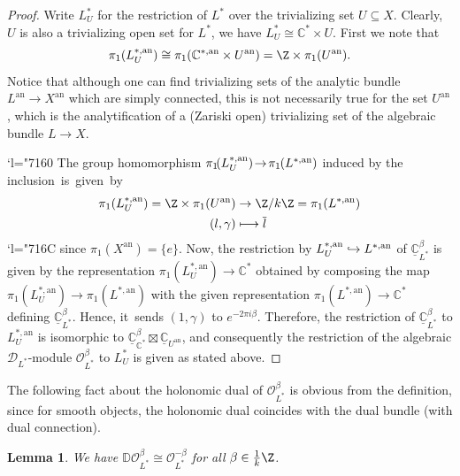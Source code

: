 \documentclass[JEP,XML,SOM,Unicode,published]{cedram}
\let\mathds\mathbb
\newcommand{\Changel}{\mathcode`l="7160}
\newcommand{\Changelback}{\mathcode`l="716C}
\newcommand\mto{\mathchoice{\longmapsto}{\mapsto}{\mapsto}{\mapsto}}
\newcommand\hto{\mathrel{\lhook\joinrel\to}}
\newtheorem{lem}[thm]{Lemma}
\newcommand{\dC}{{\mathds C}}\let\C\dC
\newcommand{\bD}{{\mathbb D}}\let\mbd\bD
\newcommand{\cD}{\mathscr{D}}
\newcommand{\cO}{\mathcal{O}}\let\O\cO
\begin{document}
\begin{proof}
Write $L_U^*$ for the restriction of $L^*$ over the trivializing set $U\subseteq X$. Clearly, $U$ is also a trivializing open set for $L^*$, \ie we have $L^*_{U}\cong \dC^*\times U$. First we note that
\[
\pi_1(L_U^{*,\mathrm{an}})\cong \pi_1(\dC^{*,\mathrm{an}}\times U^{\mathrm{an}})=\Z\times \pi_1(U^\mathrm{an}).
\]
Notice that although one can find trivializing sets of the analytic bundle $L^\mathrm{an}\to X^\mathrm{an}$ which are simply connected, this is not necessarily true for the set $U^\mathrm{an}$, which is the analytification of a (Zariski open) trivializing set of the algebraic bundle $L\to X$.

\Changel%
The group homomorphism $\pi_1\mkern-3mu(L_U^{*,\mathrm{an}}) \mkern-3mu\to\! \pi_1\mkern-1mu(L^{*,\mathrm{an}})$ induced by the inclusion~is~given~by
\begin{align*}
\pi_1(L_U^{*,\mathrm{an}}) = \Z\times \pi_1(U^\mathrm{an}) & \to \Z/k\Z = \pi_1(L^{*,\mathrm{an}}) \\
(l,\gamma) & \mto \overline{l}
\end{align*}\Changelback%
since $\pi_1(X^\mathrm{an})=\{e\}$.
Now, the restriction by $L_U^{*,\mathrm{an}} \hto L^{*,\mathrm{an}}$ of $\underline{\dC}^\beta_{L^*}$ is given by the representation $\pi_1(L_U^{*,\mathrm{an}})\to \dC^*$ obtained by composing the map $\pi_1(L_U^{*,\mathrm{an}}) \to \pi_1(L^{*,\mathrm{an}})$ with the given representation $\pi_1(L^{*,\mathrm{an}})\to \dC^*$ defining $\underline{\dC}^\beta_{L^*}$. Hence, it~sends $(1,\gamma)$ to $e^{-2\pi i \beta}$. Therefore, the restriction of $\underline{\dC}^\beta_{L^*}$ to $L^{*,\mathrm{an}}_U$ is isomorphic to $\underline{\dC}^\beta_{\C^*}\boxtimes \underline{\dC}_{U^\mathrm{an}}$, and consequently the restriction of the algebraic $\cD_{L^*}$\nobreakdash-mod\-ule $\cO_{L^*}^\beta$ to $L_U^*$ is given as stated above.
\end{proof}
The following fact about the holonomic dual of $\cO_{L^*}^\beta$ is obvious from the definition, since for smooth objects, the holonomic dual coincides with the dual bundle (with dual connection).

\begin{lem}\label{lem:OLbetaDual}
We have $\bD \cO_{L^*}^\beta\cong \cO_{L^*}^{-\beta}$
for all $\beta\in \frac{1}{k}\Z$.
\end{lem}
\end{document}
